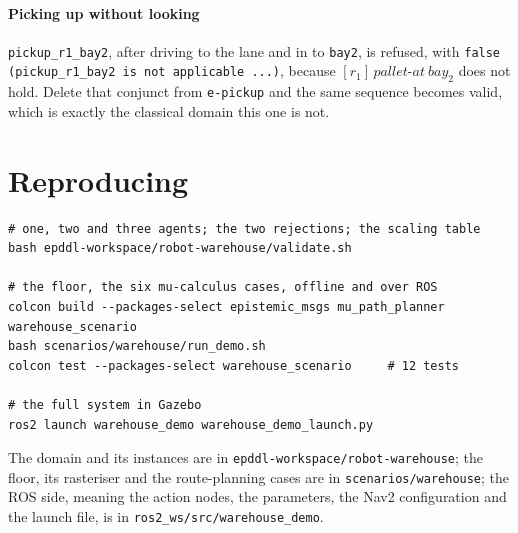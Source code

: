\documentclass[11pt,a4paper]{article}
\theoremstyle{definition}
\newcommand{\code}[1]{\texttt{\small #1}}
\begin{document}
\paragraph{Picking up without looking} \code{pickup\_r1\_bay2}, after driving
to the lane and in to \code{bay2}, is refused, with
\code{false (pickup\_r1\_bay2 is not applicable ...)}, because
$[r_1]\,\mathit{pallet\text{-}at\ bay_2}$ does not hold. Delete that conjunct
from \code{e-pickup} and the same sequence becomes valid, which is exactly the
classical domain this one is not.

\section{Reproducing}

\begin{lstlisting}
# one, two and three agents; the two rejections; the scaling table
bash epddl-workspace/robot-warehouse/validate.sh

# the floor, the six mu-calculus cases, offline and over ROS
colcon build --packages-select epistemic_msgs mu_path_planner warehouse_scenario
bash scenarios/warehouse/run_demo.sh
colcon test --packages-select warehouse_scenario     # 12 tests

# the full system in Gazebo
ros2 launch warehouse_demo warehouse_demo_launch.py
\end{lstlisting}

The domain and its instances are in \code{epddl-workspace/robot-warehouse}; the
floor, its rasteriser and the route-planning cases are in
\code{scenarios/warehouse}; the ROS side, meaning the action nodes, the
parameters, the Nav2 configuration and the launch file, is in
\code{ros2\_ws/src/warehouse\_demo}.
\end{document}
